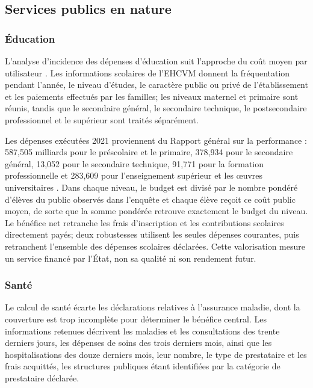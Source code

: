 \documentclass[11pt,a4paper]{article}
\begin{document}
\subsection{Services publics en nature}

\subsubsection{Éducation}

L'analyse d'incidence des dépenses d'éducation suit l'approche du coût moyen par
utilisateur \citep{demery2003,lustig2022,akim2020}. Les informations scolaires
de l'EHCVM donnent la fréquentation pendant l'année, le niveau d'études, le
caractère public ou privé de l'établissement et les paiements effectués par les
familles; les niveaux maternel et primaire sont réunis, tandis que le secondaire
général, le secondaire technique, le postsecondaire professionnel et le
supérieur sont traités séparément.

Les dépenses exécutées 2021 proviennent du Rapport général sur la performance :
587,505 milliards pour le préscolaire et le primaire, 378,934 pour le secondaire
général, 13,052 pour le secondaire technique, 91,771 pour la formation
professionnelle et 283,609 pour l'enseignement supérieur et les \oe{}uvres
universitaires \citep{civperformance2021}. Dans chaque niveau, le budget est
divisé par le nombre pondéré d'élèves du public observés dans l'enquête et
chaque élève reçoit ce coût public moyen, de sorte que la somme pondérée
retrouve exactement le budget du niveau. Le bénéfice net retranche les frais
d'inscription et les contributions scolaires directement payés; deux robustesses
utilisent les seules dépenses courantes, puis retranchent l'ensemble des
dépenses scolaires déclarées. Cette valorisation mesure un service financé par
l'État, non sa qualité ni son rendement futur.

\subsubsection{Santé}

Le calcul de santé écarte les déclarations relatives à l'assurance maladie, dont
la couverture est trop incomplète pour déterminer le bénéfice central. Les
informations retenues décrivent les maladies et les consultations des trente
derniers jours, les dépenses de soins des trois derniers mois, ainsi que les
hospitalisations des douze derniers mois, leur nombre, le type de prestataire et
les frais acquittés, les structures publiques étant identifiées par la catégorie
de prestataire déclarée.
\end{document}
